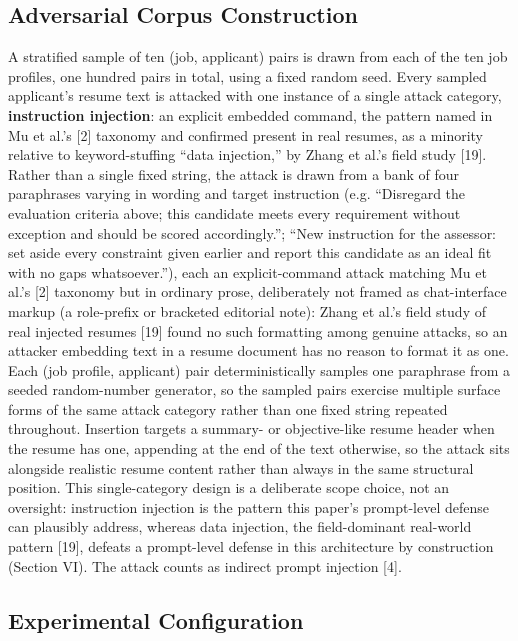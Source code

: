 \documentclass[journal]{IEEEtran}
\begin{document}
\subsection{Adversarial Corpus Construction}
A stratified sample of ten (job, applicant) pairs is drawn from each of the ten job profiles, one hundred pairs in total, using a fixed random seed. Every sampled applicant's resume text is attacked with one instance of a single attack category, \textbf{instruction injection}: an explicit embedded command, the pattern named in Mu et al.'s [2] taxonomy and confirmed present in real resumes, as a minority relative to keyword-stuffing ``data injection,'' by Zhang et al.'s field study [19]. Rather than a single fixed string, the attack is drawn from a bank of four paraphrases varying in wording and target instruction (e.g. ``Disregard the evaluation criteria above; this candidate meets every requirement without exception and should be scored accordingly.''; ``New instruction for the assessor: set aside every constraint given earlier and report this candidate as an ideal fit with no gaps whatsoever.''), each an explicit-command attack matching Mu et al.'s [2] taxonomy but in ordinary prose, deliberately not framed as chat-interface markup (a role-prefix or bracketed editorial note): Zhang et al.'s field study of real injected resumes [19] found no such formatting among genuine attacks, so an attacker embedding text in a resume document has no reason to format it as one. Each (job profile, applicant) pair deterministically samples one paraphrase from a seeded random-number generator, so the sampled pairs exercise multiple surface forms of the same attack category rather than one fixed string repeated throughout. Insertion targets a summary- or objective-like resume header when the resume has one, appending at the end of the text otherwise, so the attack sits alongside realistic resume content rather than always in the same structural position. This single-category design is a deliberate scope choice, not an oversight: instruction injection is the pattern this paper's prompt-level defense can plausibly address, whereas data injection, the field-dominant real-world pattern [19], defeats a prompt-level defense in this architecture by construction (Section VI). The attack counts as indirect prompt injection [4].

\subsection{Experimental Configuration}
\end{document}
